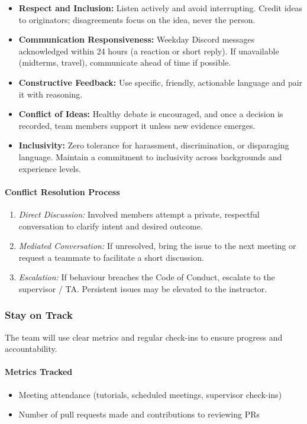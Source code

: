 \documentclass{article}
\begin{document}
\begin{itemize}
  \item \textbf{Respect and Inclusion:} Listen actively and avoid interrupting. Credit ideas to originators; disagreements focus on the idea, never the person.
  \item \textbf{Communication Responsiveness:} Weekday Discord messages acknowledged within 24 hours (a reaction or short reply). If unavailable (midterms, travel), communicate ahead of time if possible.
  \item \textbf{Constructive Feedback:} Use specific, friendly, actionable language and pair it with reasoning.
  \item \textbf{Conflict of Ideas:} Healthy debate is encouraged, and once a decision is recorded, team members support it unless new evidence emerges.
  \item \textbf{Inclusivity:} Zero tolerance for harassment, discrimination, or disparaging language. Maintain a commitment to inclusivity across backgrounds and experience levels.
\end{itemize}

\paragraph{Conflict Resolution Process}
\begin{enumerate}
  \item \textit{Direct Discussion:} Involved members attempt a private, respectful conversation to clarify intent and desired outcome.
  \item \textit{Mediated Conversation:} If unresolved, bring the issue to the next meeting or request a teammate to facilitate a short discussion.
  \item \textit{Escalation:} If behaviour breaches the Code of Conduct, escalate to the supervisor / TA. Persistent issues may be elevated to the instructor.
\end{enumerate}

\subsubsection*{Stay on Track}
The team will use clear metrics and regular check-ins to ensure progress and accountability.

\paragraph{Metrics Tracked}
\begin{itemize}
  \item Meeting attendance (tutorials, scheduled meetings, supervisor check-ins)
  \item Number of pull requests made and contributions to reviewing PRs
\end{itemize}
\end{document}
